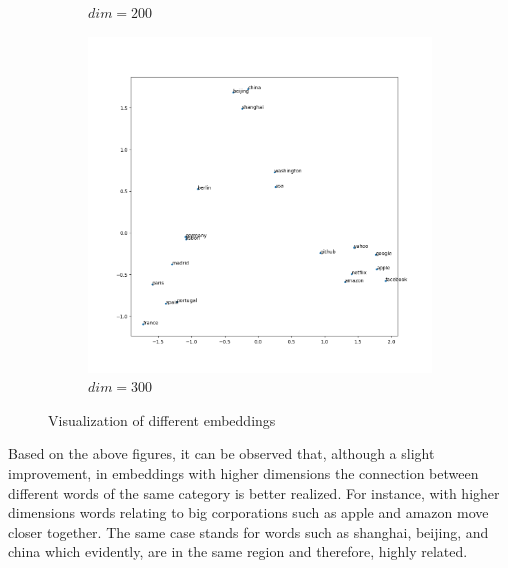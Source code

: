 \documentclass[12pt,a4paper]{article}
\begin{document}
\begin{figure}[H]
\begin{subfigure}[H]{0.32\textwidth}
			\caption{$dim=200$}
		\end{subfigure}
		\begin{subfigure}[H]{0.32\textwidth}
			\centering
			\includegraphics[width=\textwidth]{Figures/visual_300}
			\caption{$dim=300$}
		\end{subfigure}
		\caption{Visualization of different embeddings}
	\end{figure}

	\vspace{-0.5cm}
	\noindent Based on the above figures, it can be observed that, although a slight improvement, in embeddings with higher dimensions the connection between different words of the same category is better realized. For instance, with higher dimensions words relating to big corporations such as apple and amazon move closer together. The same case stands for words such as shanghai, beijing, and china which evidently, are in the same region and therefore, highly related.
	
\end{document}
